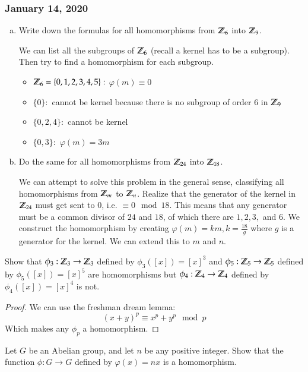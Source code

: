 \subsubsection*{January 14, 2020}


\begin{enumerate}[(a)]
	\item Write down the formulas for all homomorphisms from $\mathbb{Z}_6$ into $\mathbb{Z}_9$. 
	
	We can list all the subgroups of $\mathbb{Z}_6$ (recall a kernel has to be a subgroup). Then try to find a homomorphism for each subgroup. 
	
	\begin{itemize}
		\item $\mathbb{Z}_6=\{0,1,2,3,4,5\}:$ $\varphi(m)\equiv 0$
		\item $\{0\}:$ cannot be kernel because there is no subgroup of order $6$ in $\mathbb{Z}_9$
		\item $\{0,2,4\}:$ cannot be kernel
		\item $\{0,3\}:$  $\varphi(m)=3m$
	\end{itemize}

	\item Do the same for all homomorphisms from $\mathbb{Z}_{24}$ into $\mathbb{Z}_{18}$. 
	
	We can attempt to solve this problem in the general sense, classifying all homomorphisms from $\mathbb{Z}_m$ to $\mathbb{Z}_n$. Realize that the generator of the kernel in $\mathbb{Z}_{24}$ must get sent to $0$, i.e. $\equiv 0\mod 18$. This means that any generator must be a common divisor of $24$ and $18$, of which there are $1, 2, 3, $ and $6$. We construct the homomorphism by creating $\varphi(m)=km, k=\frac{18}{g}$ where $g$ is a generator for the kernel. We can extend this to $m$ and $n$. 
\end{enumerate}

 Show that $\phi_3: \mathbb{Z}_3\to \mathbb{Z}_3$ defined by $\phi_3([x])=[x]^3$ and $\phi_5: \mathbb{Z}_5\to \mathbb{Z}_5$ defined by $\phi_5([x])=[x]^5$ are homomorphisms but $\phi_4: \mathbb{Z}_4\to \mathbb{Z}_4$ defined by $\phi_4([x])=[x]^4$ is not. 

\begin{proof}
	We can use the freshman dream lemma: 
	\[(x+y)^p \equiv x^p + y^p\mod p\]
	Which makes any $\phi_p$ a homomorphism. 
\end{proof}

 Let $G$ be an Abelian group, and let $n$ be any positive integer. Show that the function $\phi:G\to G$ defined by $\varphi(x)=nx$ is a homomorphism. 

